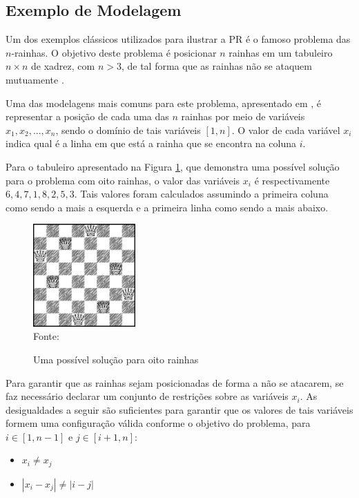 \subsection{Exemplo de Modelagem}
\label{ss:exemplo-de-modelagem}

Um dos exemplos clássicos utilizados para ilustrar a PR é o famoso problema das $n$-rainhas. O objetivo deste problema é posicionar $n$ rainhas em um tabuleiro $n \times n$ de xadrez, com $n > 3$, de tal forma que as rainhas não se ataquem mutuamente \cite{apt}.

Uma das modelagens mais comuns para este problema, apresentado em \cite{apt}, é representar a posição de cada uma das $n$ rainhas por meio de variáveis $x_1, x_2, ..., x_n$, sendo o domínio de tais variáveis $[1,n]$. O valor de cada variável $x_i$ indica qual é a linha em que está a rainha que se encontra na coluna $i$.

Para o tabuleiro apresentado na Figura \ref{fg:8-queens}, que demonstra uma possível solução para o problema com oito rainhas, o valor das variáveis $x_i$ é respectivamente $6, 4, 7, 1, 8, 2, 5, 3$. Tais valores foram calculados assumindo a primeira coluna como sendo a mais a esquerda e a primeira linha como sendo a mais abaixo.

\begin{figure}[!ht]
  \centering
  \caption{Uma possível solução para oito rainhas}
  \label{fg:8-queens}
  \includegraphics[width=0.35\textwidth]{figuras/8_queens.png}
  \\ Fonte: \cite{apt}
\end{figure}

Para garantir que as rainhas sejam posicionadas de forma a não se atacarem, se faz necessário declarar um conjunto de restrições sobre as variáveis $x_i$. As desigualdades a seguir são suficientes para garantir que os valores de tais variáveis formem uma configuração válida conforme o objetivo do problema, para $i \in [1,n-1]$ e $j \in [i+1,n]$:

\begin{itemize}
  \item $x_i \not= x_j$
  \item $|x_i - x_j| \not= |i - j|$
\end{itemize}


